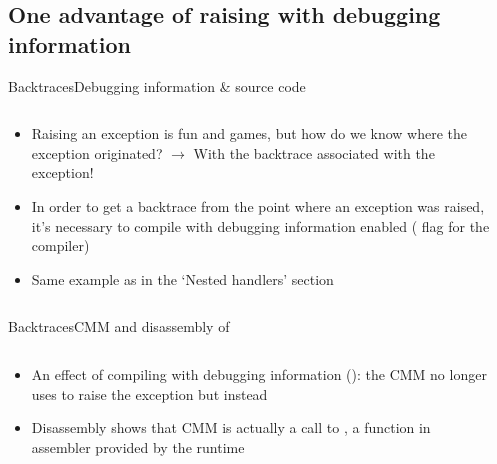%
%
\subsection{One advantage of raising with debugging information}
\frameSubsection{}{}

\begin{frame}{Backtraces}{Debugging information \& source code}
  \begin{columns}[c]
    \begin{column}{0.5\textwidth}
      \begin{itemize}
        \item Raising an exception is fun and games, but how do we know where the exception originated? $\rightarrow$ With the backtrace associated with the exception!
        \item In order to get a backtrace from the point where an exception was raised, it's necessary to compile with debugging information enabled ( flag for the compiler)
        \item Same example as in the `Nested handlers' section
      \end{itemize}
    \end{column}
    \begin{column}{0.5\textwidth}
    \end{column}
  \end{columns}
\end{frame}

\begin{frame}{Backtraces}{CMM and disassembly of }
  \begin{columns}[c]
    \begin{column}{0.5\textwidth}
      \minipage[c][0.66\textheight][s]{\columnwidth}
      \begin{itemize}
        \item<1-> An effect of compiling with debugging information (): the CMM no longer uses  to raise the exception but  instead
        \item<2-> Disassembly shows that CMM  is actually a call to , a function in assembler provided by the runtime
      \end{itemize}
      \vfill
      \endminipage
    \end{column}
    \begin{column}{0.5\textwidth}
    \end{column}
  \end{columns}
\end{frame}


